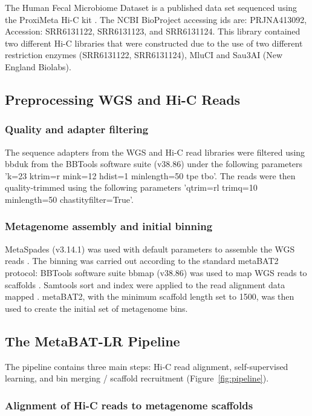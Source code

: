 \documentclass[fleqn,10pt,lineno]{wlpeerj}
\begin{document}
The Human Fecal Microbiome Dataset is a published data set sequenced using the ProxiMeta Hi-C kit \citep{press2017hi}. The NCBI BioProject accessing ids are: PRJNA413092, Accession: SRR6131122, SRR6131123, and SRR6131124. This library contained two different Hi-C libraries that were constructed due to the use of two different restriction enzymes (SRR6131122, SRR6131124), MluCI and Sau3AI (New England Biolabs).    

\subsection*{Preprocessing WGS and Hi-C Reads}

\subsubsection*{Quality and adapter filtering}

The sequence adapters from the WGS and Hi-C read libraries were filtered using bbduk from the BBTools software suite (v38.86) \citep{bushnell2014bbmap} under the following parameters 'k=23 ktrim=r mink=12 hdist=1 minlength=50 tpe tbo'. The reads were then quality-trimmed using the following parameters 'qtrim=rl trimq=10 minlength=50 chastityfilter=True'. 

\subsubsection*{Metagenome assembly and initial binning}

MetaSpades (v3.14.1) was used with default parameters to assemble the WGS reads \citep{nurk2017metaspades}. The binning was carried out according to the standard metaBAT2 protocol: BBTools software suite bbmap (v38.86) was used to map WGS reads to scaffolds \citep{bushnell2014bbmap}. Samtools sort and index were applied to the read alignment data mapped \citep{li2009sequence}. metaBAT2, with the minimum scaffold length set to 1500, was then used to create the initial set of metagenome bins.

\subsection*{The MetaBAT-LR Pipeline}

The pipeline contains three main steps: Hi-C read alignment, self-supervised learning, and bin merging / scaffold recruitment (Figure~\ref{fig:pipeline}).

\subsubsection*{Alignment of Hi-C reads to metagenome scaffolds} 
\end{document}
